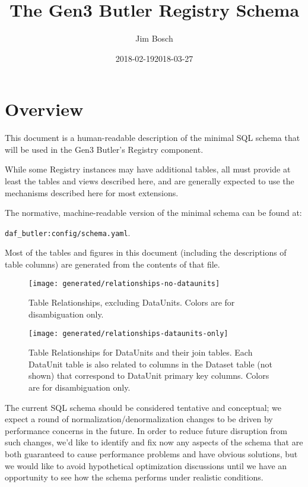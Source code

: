 \documentclass[DM,toc]{lsstdoc}
\title{The Gen3 Butler Registry Schema}
\author{Jim Bosch}
\date{2018-02-19}
\date{2018-03-27}
\begin{document}
\maketitle

\section{Overview}
\label{sec:overview}

This document is a human-readable description of the minimal SQL schema that will be used in the Gen3 Butler's Registry component.

While some Registry instances may have additional tables, all must provide at least the tables and views described here, and are generally expected to use the mechanisms described here for most extensions.

The normative, machine-readable version of the minimal schema can be found at:

\verb`daf_butler:config/schema.yaml`.

Most of the tables and figures in this document (including the descriptions of table columns) are generated from the contents of that file.

\begin{figure}
    \centering
    \texttt{[image: generated/relationships-no-dataunits]}
    \caption{Table Relationships, excluding DataUnits.
    Colors are for disambiguation only.}
    \label{fig:relationships-no-dataunits}
\end{figure}

\begin{figure}
    \centering
    \texttt{[image: generated/relationships-dataunits-only]}
    \caption{Table Relationships for DataUnits and their join tables.
    Each DataUnit table is also related to columns in the Dataset table (not shown) that correspond to DataUnit primary key columns.
    Colors are for disambiguation only.}
    \label{fig:relationships-dataunits-only}
\end{figure}

The current SQL schema should be considered tentative and conceptual; we expect a round of normalization/denormalization changes to be driven by performance concerns in the future.
In order to reduce future disruption from such changes, we'd like to identify and fix now any aspects of the schema that are both guaranteed to cause performance problems and have obvious solutions, but we would like to avoid hypothetical optimization discussions until we have an opportunity to see how the schema performs under realistic conditions.
\end{document}

